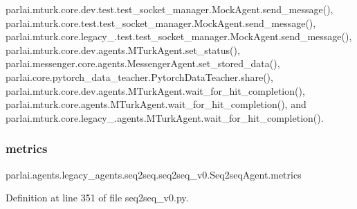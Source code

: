 parlai.\+mturk.\+core.\+dev.\+test.\+test\+\_\+socket\+\_\+manager.\+Mock\+Agent.\+send\+\_\+message(), parlai.\+mturk.\+core.\+test.\+test\+\_\+socket\+\_\+manager.\+Mock\+Agent.\+send\+\_\+message(), parlai.\+mturk.\+core.\+legacy\+\_.\+test.\+test\+\_\+socket\+\_\+manager.\+Mock\+Agent.\+send\+\_\+message(), parlai.\+mturk.\+core.\+dev.\+agents.\+M\+Turk\+Agent.\+set\+\_\+status(), parlai.\+messenger.\+core.\+agents.\+Messenger\+Agent.\+set\+\_\+stored\+\_\+data(), parlai.\+core.\+pytorch\+\_\+data\+\_\+teacher.\+Pytorch\+Data\+Teacher.\+share(), parlai.\+mturk.\+core.\+dev.\+agents.\+M\+Turk\+Agent.\+wait\+\_\+for\+\_\+hit\+\_\+completion(), parlai.\+mturk.\+core.\+agents.\+M\+Turk\+Agent.\+wait\+\_\+for\+\_\+hit\+\_\+completion(), and parlai.\+mturk.\+core.\+legacy\+\_.\+agents.\+M\+Turk\+Agent.\+wait\+\_\+for\+\_\+hit\+\_\+completion().

\mbox{\label{classparlai_1_1agents_1_1legacy__agents_1_1seq2seq_1_1seq2seq__v0_1_1Seq2seqAgent_ac50fcecc3b2ec89ece9bf75df8e21c6d}} 
\subsubsection{\texorpdfstring{metrics}{metrics}}
{\footnotesize\ttfamily parlai.\+agents.\+legacy\+\_\+agents.\+seq2seq.\+seq2seq\+\_\+v0.\+Seq2seq\+Agent.\+metrics}



Definition at line 351 of file seq2seq\+\_\+v0.\+py.



